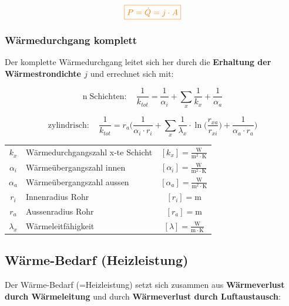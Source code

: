 $$ \textcolor{orange}{  \boxed{ P =  \dot{Q} = j \cdot A } } $$ 







\subsubsection{Wärmedurchgang komplett}

Der komplette Wärmedurchgang leitet sich her durch die \textbf{Erhaltung der Wärmestrondichte $j$} und errechnet sich mit:


$$ \boxed{\mathrm{n \; Schichten:} \quad \frac{1}{k_{tot}} = \frac{1}{\alpha_i} + \sum_x  \frac{1}{k_x} + \frac{1}{\alpha_a}  }  $$

$$ \boxed{\mathrm{zylindrisch:} \quad \frac{1}{k_{tot}} = r_a \Big(  \frac{1}{\alpha_i \cdot r_i} + \sum_x \frac{1}{\lambda_x} \cdot \ln \big( \frac{r_{xa}}{r_{xi}} \big)  + \frac{1}{\alpha_a \cdot r_a} \Big) }  $$




\begin{tabular}{c l c}
	\rule{0pt}{10pt}$k_x$ & Wärmedurchgangszahl x-te Schicht & $[k_x] = \mathrm{\frac{W}{m^2 \cdot K}}$ \\
	\rule{0pt}{10pt}$\alpha_i$ & Wärmeübergangszahl innen & $[\alpha_i] = \mathrm{\frac{W}{m^2 \cdot K}} $\\
	\rule{0pt}{10pt}$\alpha_a$ & Wärmeübergangszahl aussen & $[\alpha_a] = \mathrm{\frac{W}{m^2 \cdot K}} $\\
	$r_i$ & Innenradius Rohr & $[r_i] = \mathrm{m}$	 \\
	$r_a$ & Aussenradius Rohr & $[r_a] = \mathrm{m}$	 \\
	\rule{0pt}{10pt}$\lambda_x$ & Wärmeleitfähigkeit & $[\lambda] = \mathrm{\frac{W}{m \cdot K}} $\\
\end{tabular}





\subsection{Wärme-Bedarf (Heizleistung)}
Der Wärme-Bedarf (=Heizleistung) setzt sich zusammen aus \textbf{Wärmeverlust durch Wärmeleitung} und durch \textbf{Wärmeverlust durch Luftaustausch}: 

